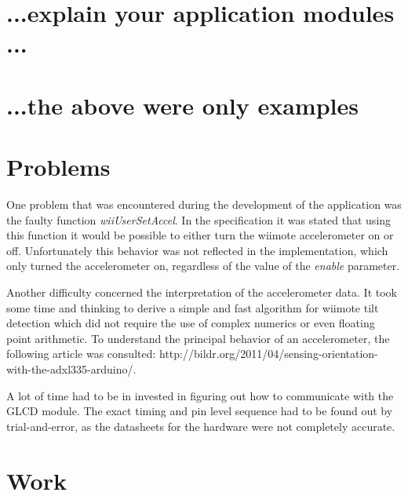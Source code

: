 \documentclass[12pt,a4paper,titlepage,oneside]{article}
\begin{document}
\section{...explain your application modules ...}

\section{...the above were only examples}



\section{Problems}

One problem that was encountered during the development of the application
was the faulty function \emph{wiiUserSetAccel}. In the specification it was
stated that using this function it would be possible to either turn the wiimote
accelerometer on or off. Unfortunately this behavior was not reflected in the
implementation, which only turned the accelerometer on, regardless of the value
of the \emph{enable} parameter.

Another difficulty concerned the interpretation of the accelerometer data. It
took some time and thinking to derive a simple and fast algorithm for wiimote
tilt detection which did not require the use of complex numerics or even 
floating point arithmetic. To understand the principal behavior of an
accelerometer, the following article was consulted: http://bildr.org/2011/04/sensing-orientation-with-the-adxl335-arduino/.

A lot of time had to be in invested in figuring out how to communicate with 
the GLCD module. The exact timing and pin level sequence had to be found out 
by trial-and-error, as the datasheets for the hardware were not completely 
accurate.

\section{Work}
\end{document}
